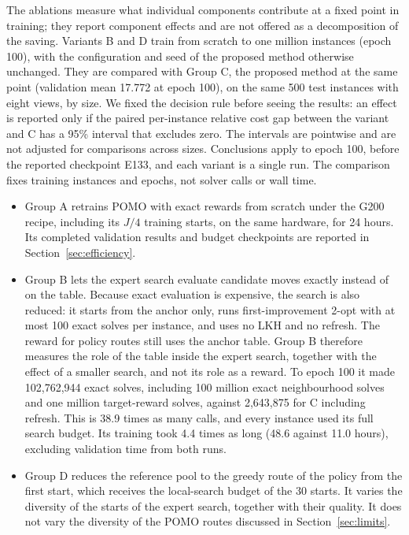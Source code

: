 \documentclass[preprint,12pt,authoryear]{elsarticle}
\begin{document}
The ablations measure what individual components contribute at a fixed point in training; they report component effects and are not offered as a decomposition of the saving. Variants B and D train from scratch to one million instances (epoch 100), with the configuration and seed of the proposed method otherwise unchanged. They are compared with Group C, the proposed method at the same point (validation mean 17.772 at epoch 100), on the same 500 test instances with eight views, by size. We fixed the decision rule before seeing the results: an effect is reported only if the paired per-instance relative cost gap between the variant and C has a 95\% interval that excludes zero. The intervals are pointwise and are not adjusted for comparisons across sizes. Conclusions apply to epoch 100, before the reported checkpoint E133, and each variant is a single run. The comparison fixes training instances and epochs, not solver calls or wall time.
\begin{itemize}
\item Group A retrains POMO with exact rewards from scratch under the G200 recipe, including its $J/4$ training starts, on the same hardware, for 24 hours. Its completed validation results and budget checkpoints are reported in Section~\ref{sec:efficiency}.
\item Group B lets the expert search evaluate candidate moves exactly instead of on the table. Because exact evaluation is expensive, the search is also reduced: it starts from the anchor only, runs first-improvement 2-opt with at most 100 exact solves per instance, and uses no LKH and no refresh. The reward for policy routes still uses the anchor table. Group B therefore measures the role of the table inside the expert search, together with the effect of a smaller search, and not its role as a reward. To epoch 100 it made 102,762,944 exact solves, including 100 million exact neighbourhood solves and one million target-reward solves, against 2,643,875 for C including refresh. This is 38.9 times as many calls, and every instance used its full search budget. Its training took 4.4 times as long (48.6 against 11.0 hours), excluding validation time from both runs.
\item Group D reduces the reference pool to the greedy route of the policy from the first start, which receives the local-search budget of the 30 starts. It varies the diversity of the starts of the expert search, together with their quality. It does not vary the diversity of the POMO routes discussed in Section~\ref{sec:limits}.
\end{itemize}
\end{document}
